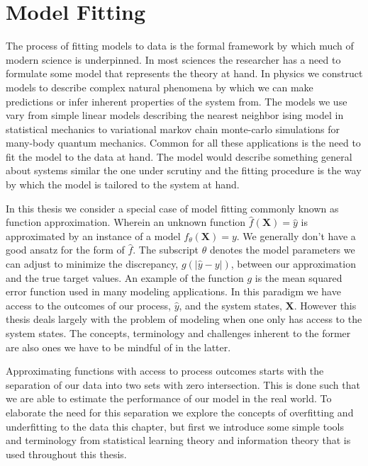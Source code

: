 \section{Model Fitting}\label{sec:models}

The process of fitting models to data is the formal framework by which much of modern science is underpinned. In most sciences the researcher has a need to formulate some model that represents the theory at hand. In physics we construct models to describe complex natural phenomena by which we can make predictions or infer inherent properties of the system from. The models we use vary from simple linear models describing the nearest neighbor ising model in statistical mechanics to variational markov chain monte-carlo simulations for many-body quantum mechanics. Common for all these applications is the need to fit the model to the data at hand. The model would describe something general about systems similar the one under scrutiny and the fitting procedure is the way by which the model is tailored to the system at hand. 

In this thesis we consider a special case of model fitting commonly known as function approximation. Wherein an unknown function $\hat{f}(\mathbf{X}) = \hat{y}$ is approximated by an instance of a model $f_\theta(\mathbf{X}) = y$. We generally don't have a good ansatz for the form of $\hat{f}$. The subscript $\theta$ denotes the model parameters we can adjust to minimize the discrepancy, $g(|\hat{y} - y|)$, between our approximation and the true target values. An  example of the function $g$ is the mean squared error function used in many modeling applications. In this paradigm we have access to the outcomes of our process, $\hat{y}$, and the system states, $\mathbf{X}$. However this thesis deals largely with the problem of modeling when one only has access to the system states. The concepts, terminology and challenges inherent to the former are also ones we have to be mindful of in the latter.

Approximating functions with access to process outcomes starts with the separation of our data into two sets with zero intersection. This is done such that we are able to estimate the performance of our model in the real world. To elaborate the need for this separation we explore the concepts of overfitting and underfitting to the data this chapter, but first we introduce some simple tools and terminology from statistical learning theory and information theory that is used throughout this thesis.


